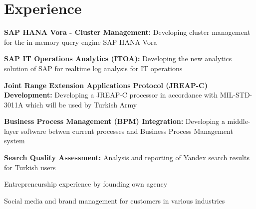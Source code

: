 \section{Experience}
\sectionspacehalf
\vspace{\topsep} %
\begin{tightitemize}
  \item \textbf{SAP HANA Vora - Cluster Management:} Developing cluster management for the in-memory query engine SAP HANA Vora
  \item \textbf{SAP IT Operations Analytics (ITOA):} Developing the new analytics solution of SAP for realtime log analysis for IT operations
\end{tightitemize}
\sectionspacehalf
\begin{tightitemize}
\item \textbf{Joint Range Extension Applications Protocol (JREAP-C) Development:} Developing a JREAP-C processor in accordance with MIL-STD-3011A which will be used by Turkish Army
\item \textbf{Business Process Management (BPM) Integration:} Developing a middle-layer software betwen current processes and
Business Process Management system
\end{tightitemize}
\sectionspacehalf
\begin{tightitemize}
\item \textbf{Search Quality Assessment:} Analysis and reporting of Yandex search results for Turkish users
\end{tightitemize}
\sectionspacehalf
\begin{tightitemize}
\item Entrepreneurship experience by founding own agency
\item Social media and brand management for customers in various industries
\end{tightitemize}
\sectionspacehalf

